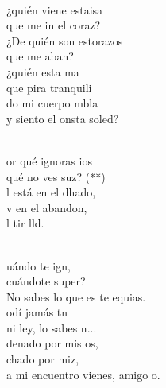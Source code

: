 \documentclass[12pt]{article}
\begin{document}
\begin{multicols*}{2}
\begin{cancion}[Saulo][Nico]%
	    \\
	¿quién viene estaisa \\
	que me in el coraz?\\
	¿De quién son estorazos \\
	que me aban?\\
	¿quién esta ma\\
	que pira tranquili\\
	do mi cuerpo mbla\\
	y siento el onsta soled?\\\jump\\
	\begin{chorus}%
	or qué ignoras ios\\
	qué no ves suz? (**)\\
	l está en el dhado,\\
	v en el abandon,\\
	l tir lld.\\
	\end{chorus}%
	\jump\\
	uándo te ign, \\
	cuándote super?\\
	No sabes lo que es te equias.\\
	odí jamás tn\\
	ni ley, lo sabes n...\\
\jump
	denado por mis os, \\
	chado por miz,\\
	a mi encuentro vienes,  amigo o.\\

\end{cancion}
\end{multicols*}
\end{document}
